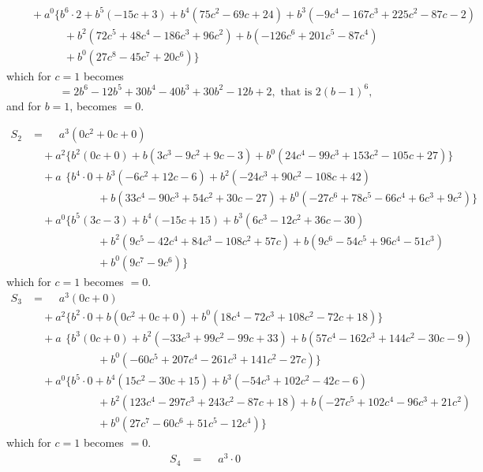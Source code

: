 \documentclass[11pt,a4paper]{book}
\begin{document}
\begin{center}
\begin{align*}
&\quad + a^0\{b^6\cdot 2 + b^5(-15c + 3) + b^4(75c^2 - 69c + 24) + b^3(-9c^4 - 167c^3 + 225c^2 - 87c - 2)\\
&\qquad\qquad + b^2(72c^5 + 48c^4 - 186c^3 + 96c^2) + b(-126c^6 + 201c^5 - 87c^4)\\
&\qquad\qquad + b^0(27c^8 - 45c^7 + 20c^6)\}
\end{align*}
which for $c=1$ becomes
\[\qquad = 2b^6 - 12b^5 + 30b^4 - 40b^3 + 30b^2 - 12b + 2,\text{ that is }2(b-1)^6,\]
and for $b=1$, becomes $=0$.

\begin{align*}
S_2 &= \phantom{+}a^3(0c^2 + 0c + 0)\\
  &\quad + a^2\{b^2(0c + 0) + b(3c^3 - 9c^2 + 9c - 3) + b^0(24c^4 - 99c^3 + 153c^2 - 105c + 27)\}\\
  &\quad + a\phantom{^2}\{b^4\cdot 0 + b^3(-6c^2 + 12c - 6) + b^2(-24c^3 + 90c^2 - 108c + 42)\\
  &\qquad\qquad\qquad + b(33c^4 - 90c^3 + 54c^2 + 30c - 27) + b^0(-27c^6 + 78c^5 - 66c^4 + 6c^3 + 9c^2)\}\\
  &\quad + a^0\{b^5(3c - 3) + b^4(-15c + 15) + b^3(6c^3 - 12c^2 + 36c - 30)\\
  &\qquad\qquad\qquad + b^2(9c^5 - 42c^4 + 84c^3 - 108c^2 + 57c) + b(9c^6 - 54c^5 + 96c^4 - 51c^3)\\
  &\qquad\qquad\qquad + b^0(9c^7 - 9c^6)\}
\end{align*}
which for $c=1$ becomes $=0$.
\begin{align*}
S_3 &= \phantom{+}a^3(0c + 0)\\
  &\quad + a^2\{b^2\cdot 0 + b(0c^2 + 0c + 0) + b^0(18c^4 - 72c^3 + 108c^2 - 72c + 18)\}\\
  &\quad + a\phantom{^2}\{b^3(0c + 0) + b^2(-33c^3 + 99c^2 - 99c + 33) + b(57c^4 - 162c^3 + 144c^2 - 30c - 9)\\
  &\qquad\qquad\qquad + b^0(-60c^5 + 207c^4 - 261c^3 + 141c^2 - 27c)\}\\
  &\quad + a^0\{b^5\cdot 0 + b^4(15c^2 - 30c + 15) + b^3(-54c^3 + 102c^2 - 42c - 6)\\
  &\qquad\qquad\qquad + b^2(123c^4 - 297c^3 + 243c^2 - 87c + 18) + b(-27c^5 + 102c^4 - 96c^3 + 21c^2)\\
  &\qquad\qquad\qquad + b^0(27c^7 - 60c^6 + 51c^5 - 12c^4)\}
\end{align*}
which for $c=1$ becomes $=0$.
\begin{align*}
S_4 &= \phantom{+}a^3\cdot 0\\

\end{align*}
\end{center}
\end{document}
